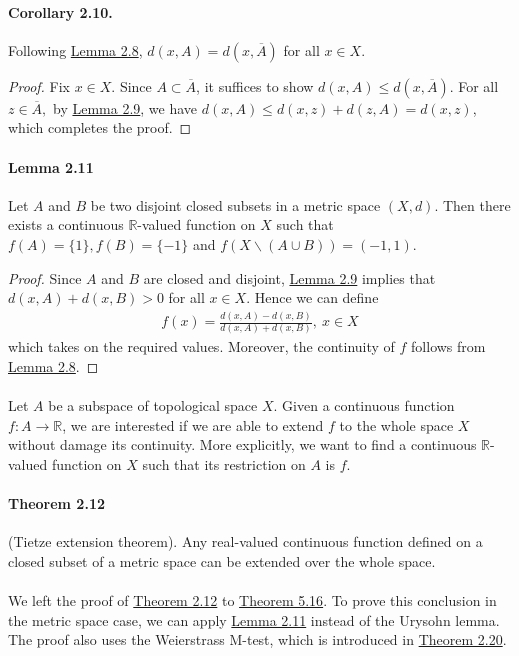 \documentclass{article}
\numberwithin{equation}{section}
\theoremstyle{plain}
\theoremstyle{definition}
\begin{document}
\paragraph{Corollary 2.10.\label{cor:2.10}} Following \hyperref[lemma:2.8]{Lemma 2.8}, $d(x,A)=d(x,\overline{A})$ for all $x\in X$.
\begin{proof}
Fix $x\in X$. Since $A\subset\overline{A}$, it suffices to show $d(x,A)\leq d(x,\overline{A})$. For all $z\in\overline{A},$ by \hyperref[lemma:2.9]{Lemma 2.9}, we have $d(x,A)\leq d(x,z) + d(z,A) = d(x,z)$, which completes the proof.
\end{proof}

\paragraph{Lemma 2.11\label{lemma:2.11}} Let $A$ and $B$ be two disjoint closed subsets in a metric space $(X,d)$. Then there exists a continuous $\mathbb{R}$-valued function on $X$ such that $f(A) = \{1\}, f(B)=\{-1\}$ and $f(X\backslash(A\cup B))=(-1,1)$.
\begin{proof}
Since $A$ and $B$ are closed and disjoint, \hyperref[lemma:2.9]{Lemma 2.9} implies that $d(x,A) + d(x,B) > 0$ for all $x\in X$. Hence we can define
\begin{align*}
	f(x) = \frac{d(x,A) - d(x,B)}{d(x,A) + d(x,B)},\ x\in X
\end{align*}
which takes on the required values. Moreover, the continuity of $f$ follows from \hyperref[lemma:2.8]{Lemma 2.8}.
\end{proof}

\paragraph{} Let $A$ be a subspace of topological space $X$. Given a continuous function $f:A\to\mathbb{R}$, we are interested if we are able to extend $f$ to the whole space $X$ without damage its continuity. More explicitly, we want to find a continuous $\mathbb{R}$-valued function on $X$ such that its restriction on $A$ is $f$.

\paragraph{Theorem 2.12\label{thm:2.12}} (Tietze extension theorem). Any real-valued continuous function defined on a closed subset of a metric space can be extended over the whole space.

\paragraph{} We left the proof of \hyperref[thm:2.12]{Theorem 2.12} to \hyperref[thm:5.16]{Theorem 5.16}. To prove this conclusion in the metric space case, we can apply \hyperref[lemma:2.11]{Lemma 2.11} instead of the Urysohn lemma. The proof also uses the Weierstrass M-test, which is introduced in \hyperref[thm:2.20]{Theorem 2.20}.
\end{document}
